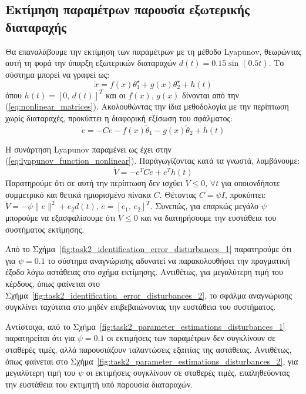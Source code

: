 \documentclass[a4paper,12pt]{article}
\begin{document}
\subsection*{Εκτίμηση παραμέτρων παρουσία εξωτερικής διαταραχής}

Θα επαναλάβουμε την εκτίμηση των παραμέτρων με τη μέθοδο Lyapunov,
θεωρώντας αυτή τη φορά την ύπαρξη εξωτερικών διαταραχών $d(t) = 0.15 \sin(0.5 t)$. Το 
σύστημα μπορεί να γραφεί ως:
\begin{equation}
    \dot{x} = f(x)\theta_1^{\star} + g(x)\theta_2^{\star} + h(t)
    \label{eq:eq:roll_angle_system_2}
\end{equation}
όπου $h(t) = [0,\, d(t)]^T$ και οι $f(x),\, g(x)$ δίνονται από την (\ref{eq:nonlinear_matrices}). Ακολουθώντας
την ίδια μεθοδολογία με την περίπτωση χωρίς διαταραχές, προκύπτει η διαφορική εξίσωση του σφάλματος:
\begin{equation}
    \dot{e} = -C e - f(x)\tilde{\theta}_1 - g(x)\tilde{\theta}_2 + h(t)
    \label{eq:lyapunov_nonlinear_identification_error_derivative}
\end{equation}

Η συνάρτηση Lyapunov παραμένει ως έχει στην 
(\ref{eq:lyapunov_function_nonlinear}). Παράγωγίζοντας κατά τα γνωστά, λαμβάνουμε:
\begin{equation}
    \dot{V} = -e^T C e + e^T h(t)
    \label{eq:lyapunov_derivative_nonlinear_disturbances}
\end{equation}
Παρατηρούμε ότι σε αυτή την περίπτωση δεν ισχύει $\dot{V} \leq 0, \, \forall t$ για οποιονδήποτε συμμετρικό και 
θετικά ημιορισμένο πίνακα $C$. Θέτοντας $C = \psi I$, προκύπτει: 
$\dot{V} = -\psi \|e\|^2 + e_2 d(t), \, e = [e_1,\, e_2]^T$. Συνεπώς, για επαρκώς μεγάλο $\psi$ μπορούμε να 
εξασφαλίσουμε ότι $\dot{V} \leq 0$ και να διατηρήσουμε την ευστάθεια του συστήματος εκτίμησης.

Από το Σχήμα~\ref{fig:task2_identification_error_disturbances_1} παρατηρούμε ότι για $\psi = 0.1$
το σύστημα αναγνώρισης αδυνατεί να παρακολουθήσει την πραγματική έξοδο λόγω αστάθειας στο σχήμα εκτίμησης. 
Αντιθέτως, για μεγαλύτερη τιμή του κέρδους, όπως φαίνεται στο 
Σχήμα~\ref{fig:task2_identification_error_disturbances_2}, το σφάλμα αναγνώρισης συγκλίνει ταχύτατα στο μηδέν 
επιβεβαιώνοντας την ευστάθεια του συστήματος.

Αντίστοιχα, από το Σχήμα~\ref{fig:task2_parameter_estimations_disturbances_1} παρατηρείται ότι για $\psi = 0.1$
οι εκτιμήσεις των παραμέτρων δεν συγκλίνουν σε σταθερές τιμές, αλλά παρουσιάζουν ταλαντώσεις εξαιτίας της 
αστάθειας. Αντιθέτως, όπως φαίνεται στο Σχήμα~\ref{fig:task2_parameter_estimations_disturbances_2}, για 
μεγαλύτερη τιμή του $\psi$ οι εκτιμήσεις συγκλίνουν σε σταθερές τιμές, επαληθεύοντας την ευστάθεια του 
εκτιμητή υπό παρουσία διαταραχών.
\end{document}
